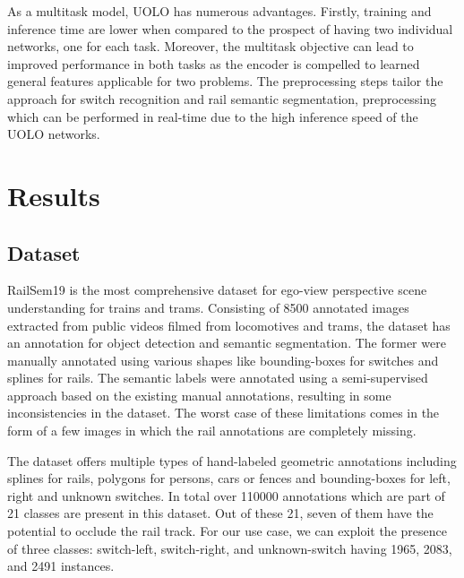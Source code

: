 \documentclass[conference]{IEEEtran}
\begin{document}
As a multitask model, UOLO has numerous advantages. Firstly, training and inference time are lower when compared to the prospect of having two individual networks, one for each task. Moreover, the multitask objective can lead to improved performance in both tasks as the encoder is compelled to learned general features applicable for two problems. The preprocessing steps tailor the approach for switch recognition and rail semantic segmentation, preprocessing which can be performed in real-time due to the high inference speed of the UOLO networks.


\section{Results}
\label{results}

\subsection{Dataset}

RailSem19 \cite{zendel2019railsem19} is the most comprehensive dataset for ego-view perspective scene understanding for trains and trams. Consisting of 8500 annotated images extracted from public videos filmed from locomotives and trams, the dataset has an annotation for object detection and semantic segmentation. The former were manually annotated using various shapes like bounding-boxes for switches and splines for rails. The semantic labels were annotated using a semi-supervised approach based on the existing manual annotations, resulting in some inconsistencies in the dataset. The worst case of these limitations comes in the form of a few images in which the rail annotations are completely missing. 

The dataset offers multiple types of hand-labeled geometric annotations including splines for rails, polygons for persons, cars or fences and bounding-boxes for left, right and unknown switches. In total over 110000 annotations which are part of 21 classes are present in this dataset. Out of these 21, seven of them have the potential to occlude the rail track. For our use case, we can exploit the presence of three classes: switch-left, switch-right, and unknown-switch having 1965, 2083, and 2491 instances. 
\end{document}
